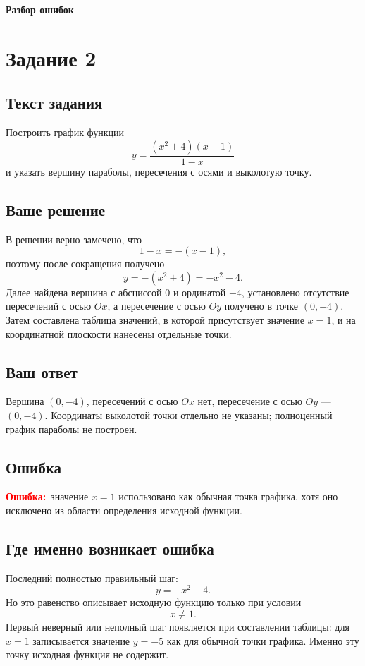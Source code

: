 \documentclass[12pt,a4paper]{article}
\newcommand{\errlabel}{\textcolor{red}{\textbf{Ошибка:}}}
\begin{document}
\newpage
\thispagestyle{empty}
\vspace*{0.38\textheight}
\begin{center}
{\Huge\bfseries Разбор ошибок}
\end{center}
\vfill

\newpage
{}\label{task:2}
\section*{Задание 2}

\subsection*{Текст задания}
Построить график функции
\[
y=\frac{(x^2+4)(x-1)}{1-x}
\]
и указать вершину параболы, пересечения с осями и выколотую точку.

\subsection*{Ваше решение}
В решении верно замечено, что
\[
1-x=-(x-1),
\]
поэтому после сокращения получено
\[
y=-(x^2+4)=-x^2-4.
\]
Далее найдена вершина с абсциссой $0$ и ординатой $-4$, установлено отсутствие пересечений с осью $Ox$, а пересечение с осью $Oy$ получено в точке $(0,-4)$. Затем составлена таблица значений, в которой присутствует значение $x=1$, и на координатной плоскости нанесены отдельные точки.

\subsection*{Ваш ответ}
Вершина $(0,-4)$, пересечений с осью $Ox$ нет, пересечение с осью $Oy$ --- $(0,-4)$. Координаты выколотой точки отдельно не указаны; полноценный график параболы не построен.

\subsection*{Ошибка}
\errlabel\ значение $x=1$ использовано как обычная точка графика, хотя оно исключено из области определения исходной функции.

\subsection*{Где именно возникает ошибка}
Последний полностью правильный шаг:
\[
y=-x^2-4.
\]
Но это равенство описывает исходную функцию только при условии
\[
x\ne1.
\]
Первый неверный или неполный шаг появляется при составлении таблицы: для $x=1$ записывается значение $y=-5$ как для обычной точки графика. Именно эту точку исходная функция не содержит.
\end{document}
